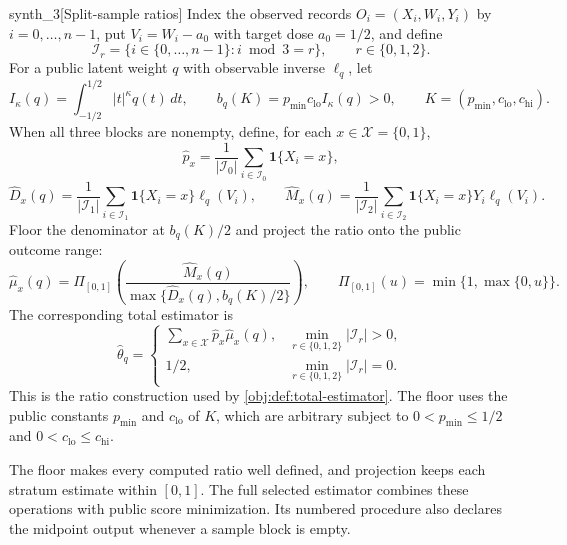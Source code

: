 \documentclass[11pt]{article}
\begin{document}
\begin{definitionv}{synth_3}[Split-sample ratios]
Index the observed records \(O_i=(X_i,W_i,Y_i)\) by \(i=0,\ldots,n-1\), put \(V_i=W_i-a_0\) with target dose \(a_0=1/2\), and define
\[
\mathcal I_r=\{i\in\{0,\ldots,n-1\}:i\bmod3=r\},
\qquad r\in\{0,1,2\}.
\]
For a public latent weight \(q\) with observable inverse \(\ell_q\), let
\[
I_\kappa(q)=\int_{-1/2}^{1/2}|t|^\kappa q(t)\,dt,
\qquad
b_q(K)=p_{\min}c_{\mathrm{lo}}I_\kappa(q)>0,
\qquad K=(p_{\min},c_{\mathrm{lo}},c_{\mathrm{hi}}).
\]
When all three blocks are nonempty, define, for each \(x\in\mathcal X=\{0,1\}\),
\[
\widehat p_x
=\frac1{|\mathcal I_0|}\sum_{i\in\mathcal I_0}\mathbf1\{X_i=x\},
\]
\[
\widehat D_x(q)
=\frac1{|\mathcal I_1|}\sum_{i\in\mathcal I_1}\mathbf1\{X_i=x\}\ell_q(V_i),
\qquad
\widehat M_x(q)
=\frac1{|\mathcal I_2|}\sum_{i\in\mathcal I_2}\mathbf1\{X_i=x\}Y_i\ell_q(V_i).
\]
Floor the denominator at \(b_q(K)/2\) and project the ratio onto the public outcome range:
\[
\widehat\mu_x(q)
=\Pi_{[0,1]}\!\left(
\frac{\widehat M_x(q)}{\max\{\widehat D_x(q),b_q(K)/2\}}
\right),
\qquad
\Pi_{[0,1]}(u)=\min\{1,\max\{0,u\}\}.
\]
The corresponding total estimator is
\[
\widehat\theta_q
=
\begin{cases}
\displaystyle\sum_{x\in\mathcal X}\widehat p_x\widehat\mu_x(q),
&\min_{r\in\{0,1,2\}}|\mathcal I_r|>0,\\
1/2,&\min_{r\in\{0,1,2\}}|\mathcal I_r|=0.
\end{cases}
\]
This is the ratio construction used by \cref{obj:def:total-estimator}. The floor uses the public constants \(p_{\min}\) and \(c_{\mathrm{lo}}\) of \(K\), which are arbitrary subject to \(0<p_{\min}\le1/2\) and \(0<c_{\mathrm{lo}}\le c_{\mathrm{hi}}\).
\end{definitionv}

The floor makes every computed ratio well defined, and projection keeps each stratum estimate within \([0,1]\). The full selected estimator  combines these operations with public score minimization. Its numbered procedure also declares the midpoint output whenever a sample block is empty.
\end{document}
